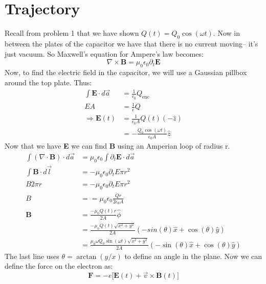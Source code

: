 \documentclass[a4paper, 11pt]{article}
\begin{document}
\section*{Trajectory} 
Recall from problem 1 that we have shown  $Q(t) = Q_0\cos(\omega t)$. Now in between the plates of the capacitor we have that there is no current moving-- it's just vacuum. So Maxwell's equation for Ampere's law becomes: 
	\begin{equation*}
		\nabla \times \mathbf{B} = \mu_0\epsilon_0\partial_t \mathbf{E} 
	\end{equation*}
Now, to find the electric field in the capacitor, we will use a Gaussian pillbox around the top plate. Thus: 
	\begin{align*}
		\int \mathbf{E} \cdot d\vec{a} &= \frac{1}{\epsilon_0}Q_{\text{enc}} \\ 
		EA &= \frac{1}{\epsilon}Q \\ 
		\Rightarrow \mathbf{E}(t)&= \frac{1}{\epsilon_0 A}Q(t)(-\hat{z})\\ 
		&= -\frac{Q_0\cos(\omega t)}{\epsilon_0 A}\hat{z}
	\end{align*}	
Now that we have \textbf{E} we can find \textbf{B} using an Amperian loop of radius r. 
	\begin{align*}
		\int (\nabla \cdot \mathbf{B})\cdot d\vec{a} &= \mu_0\epsilon_0\int\partial_t \mathbf{E} \cdot d\vec{a} \\ 
		\int \mathbf{B}\cdot d\vec{l} &= -\mu_0\epsilon_0\partial_t E \pi r^2 \\
		B2\pi r &= -\mu_0\epsilon_0\partial_t E \pi r^2  \\ 
		B &= =\mu_0\epsilon_0\frac{\dot{Q}r}{2\epsilon_0 A} \\ 
		\mathbf{B} &= \frac{-\mu_0 \dot{Q}(t)r}{2A}\hat{\phi} \\
					&=\frac{-\mu_0 \dot{Q}(t)\sqrt{x^2+y^2}}{2A}(-sin(\theta)\hat{x} + \cos(\theta)\hat{y}) \\ 
					&= \frac{\mu_0\omega Q_0 \sin(\omega t)\sqrt{x^2+y^2}}{2A}(-\sin(\theta)\hat{x} + \cos(\theta)\hat{y})
	\end{align*}
The last line uses $\theta = \arctan(y/x)$ to define an angle in the plane. Now we can define the force on the electron as: 
	\begin{equation}
		\mathbf{F} = -e\big[\mathbf{E}(t) + \vec{v}\times\mathbf{B}(t)\big]
	\end{equation}
\end{document}
